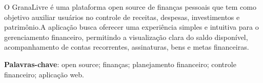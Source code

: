 

\begin{resumo}[Resumo]

  O GranaLivre é uma plataforma open source de finanças pessoais que tem como objetivo auxiliar usuários no controle de receitas, despesas, investimentos e patrimônio.A aplicação busca oferecer uma experiência simples e intuitiva para o gerenciamento financeiro, permitindo a visualização clara do saldo disponível, acompanhamento de contas recorrentes, assinaturas, bens e metas financeiras.

  \vspace{\onelineskip} %
  \noindent %
  \textbf{Palavras-chave}: open source; finanças; planejamento financeiro; controle financeiro; aplicação web.
\end{resumo}



